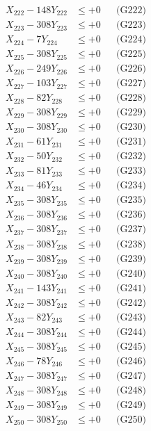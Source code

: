 \documentclass[a4paper,10pt]{article}
\begin{document}
{\begin{align}
X_{222} - 148Y_{222} &\leq +0 && \text{(G222)} \\
X_{223} - 308Y_{223} &\leq +0 && \text{(G223)} \\
X_{224} - 7Y_{224} &\leq +0 && \text{(G224)} \\
X_{225} - 308Y_{225} &\leq +0 && \text{(G225)} \\
X_{226} - 249Y_{226} &\leq +0 && \text{(G226)} \\
X_{227} - 103Y_{227} &\leq +0 && \text{(G227)} \\
X_{228} - 82Y_{228} &\leq +0 && \text{(G228)} \\
X_{229} - 308Y_{229} &\leq +0 && \text{(G229)} \\
X_{230} - 308Y_{230} &\leq +0 && \text{(G230)} \\
\allowbreak
X_{231} - 61Y_{231} &\leq +0 && \text{(G231)} \\
X_{232} - 50Y_{232} &\leq +0 && \text{(G232)} \\
X_{233} - 81Y_{233} &\leq +0 && \text{(G233)} \\
X_{234} - 46Y_{234} &\leq +0 && \text{(G234)} \\
X_{235} - 308Y_{235} &\leq +0 && \text{(G235)} \\
X_{236} - 308Y_{236} &\leq +0 && \text{(G236)} \\
X_{237} - 308Y_{237} &\leq +0 && \text{(G237)} \\
X_{238} - 308Y_{238} &\leq +0 && \text{(G238)} \\
X_{239} - 308Y_{239} &\leq +0 && \text{(G239)} \\
X_{240} - 308Y_{240} &\leq +0 && \text{(G240)} \\
\allowbreak
X_{241} - 143Y_{241} &\leq +0 && \text{(G241)} \\
X_{242} - 308Y_{242} &\leq +0 && \text{(G242)} \\
X_{243} - 82Y_{243} &\leq +0 && \text{(G243)} \\
X_{244} - 308Y_{244} &\leq +0 && \text{(G244)} \\
X_{245} - 308Y_{245} &\leq +0 && \text{(G245)} \\
X_{246} - 78Y_{246} &\leq +0 && \text{(G246)} \\
X_{247} - 308Y_{247} &\leq +0 && \text{(G247)} \\
X_{248} - 308Y_{248} &\leq +0 && \text{(G248)} \\
X_{249} - 308Y_{249} &\leq +0 && \text{(G249)} \\
X_{250} - 308Y_{250} &\leq +0 && \text{(G250)} \\

\end{align}}
\end{document}
